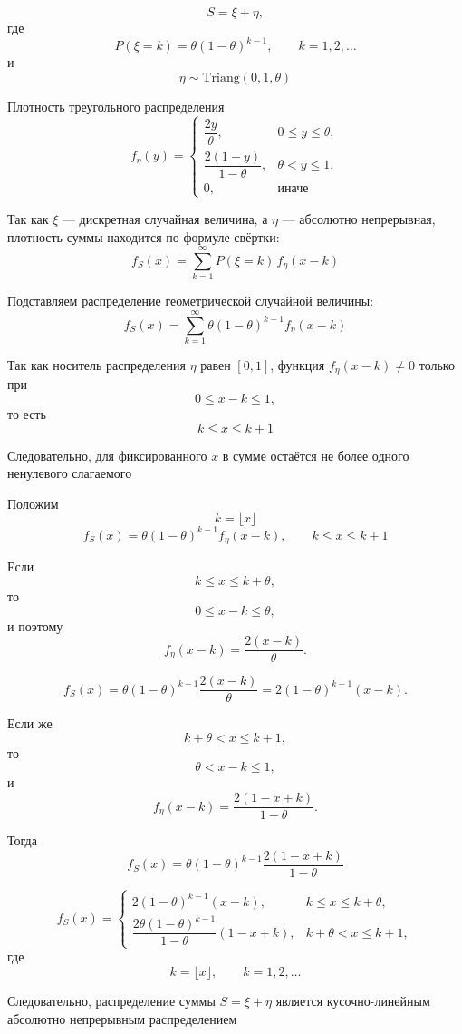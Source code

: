 \documentclass[12pt,a4paper]{article}
\theoremstyle{definition}
\begin{document}
\[S=\xi+\eta,\]
где
\[P(\xi=k)=\theta(1-\theta)^{k-1},\qquad k=1,2,\dots\]
и
\[\eta\sim \mathrm{Triang}(0,1,\theta)\]

Плотность треугольного распределения
\[f_\eta(y)=
\begin{cases}
\dfrac{2y}{\theta},
& 0\le y\le \theta,
\\[8pt]
\dfrac{2(1-y)}{1-\theta},
& \theta< y\le 1,
\\[8pt]0,
& \text{иначе}
\end{cases}\]

Так как \(\xi\) — дискретная случайная величина, а \(\eta\) —
абсолютно непрерывная, плотность суммы находится по формуле
свёртки:
\[f_S(x)=
\sum_{k=1}^{\infty}
P(\xi=k)\,f_\eta(x-k)\]

Подставляем распределение геометрической случайной величины:
\[f_S(x)=\sum_{k=1}^{\infty}\theta(1-\theta)^{k-1}f_\eta(x-k)\]

Так как носитель распределения \(\eta\) равен \([0,1]\),
функция \(f_\eta(x-k)\neq0\) только при
\[0\le x-k\le1,\]
то есть
\[k\le x\le k+1\]

Следовательно, для фиксированного \(x\) в сумме остаётся
не более одного ненулевого слагаемого

Положим
\[k=\lfloor x\rfloor\]
\[f_S(x)=
\theta(1-\theta)^{k-1}f_\eta(x-k),
\qquad k\le x\le k+1\]

Если
\[k\le x\le k+\theta,\]
то
\[0\le x-k\le\theta,\]
и поэтому
\[f_\eta(x-k)=\frac{2(x-k)}{\theta}.\]

\[f_S(x)
=\theta(1-\theta)^{k-1}
\frac{2(x-k)}{\theta}
=2(1-\theta)^{k-1}(x-k).\]

Если же
\[k+\theta < x\le k+1,\]
то
\[\theta < x-k\le1,\]
и
\[f_\eta(x-k)=\frac{2(1-x+k)}{1-\theta}.\]

Тогда
\[f_S(x)
=
\theta(1-\theta)^{k-1}\frac{2(1-x+k)}{1-\theta}\]

\[\boxed{f_S(x)=
\begin{cases}
2(1-\theta)^{k-1}(x-k),
&
k\le x\le k+\theta,
\\[10pt]
\dfrac{2\theta(1-\theta)^{k-1}}{1-\theta}(1-x+k),
&
k+\theta < x\le k+1,
\end{cases}}\]
где
\[k=\lfloor x\rfloor,\qquad k=1,2,\dots\]

Следовательно, распределение суммы \(S=\xi+\eta\)
является кусочно-линейным абсолютно непрерывным распределением
\end{document}
